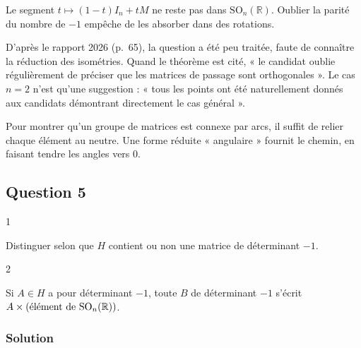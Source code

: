 \documentclass[11pt,a4paper]{article}
\begin{document}
\begin{piege}

Le segment \(t\mapsto(1-t)I_n+tM\) ne reste pas dans \({\mathrm{SO}}_n(\mathbb R)\). Oublier la parité du nombre de \(-1\) empêche de les absorber dans des rotations.

\end{piege}

\begin{jury}

D'après le rapport 2026 (p.~65), la question a été peu traitée, faute de connaître la réduction des isométries. Quand le théorème est cité, « le candidat oublie régulièrement de préciser que les matrices de passage sont orthogonales ». Le cas \(n=2\) n'est qu'une suggestion : « tous les points ont été naturellement donnés aux candidats démontrant directement le cas général ».

\end{jury}

\begin{methode}

Pour montrer qu'un groupe de matrices est connexe par arcs, il suffit de relier chaque élément au neutre. Une forme réduite « angulaire » fournit le chemin, en faisant tendre les angles vers \(0\).

\end{methode}

\hypertarget{question-5}{%
\subsection{Question 5}\label{question-5}}

\begin{indication}{1}

Distinguer selon que \(H\) contient ou non une matrice de déterminant \(-1\).

\end{indication}

\begin{indication}{2}

Si \(A\in H\) a pour déterminant \(-1\), toute \(B\) de déterminant \(-1\) s'écrit \(A\times(\text{\text{élément} de }{\mathrm{SO}}_n(\mathbb R))\).

\end{indication}

\hypertarget{solution-4}{%
\subsubsection{Solution}\label{solution-4}}
\end{document}
